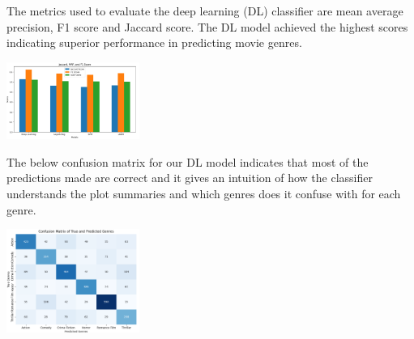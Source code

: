 \documentclass[hbrs-poster.tex]{subfiles}
\begin{document}
    {
    The metrics used to evaluate the deep learning (DL) classifier are mean average precision, F1 score and Jaccard score. The DL model achieved the highest scores indicating superior performance in predicting movie genres.
        \begin{tikzfigure}
                \includegraphics[width=0.325\textwidth, height=0.1\textheight]{figures/metrics.png}
            \end{tikzfigure}

    The below confusion matrix for our DL model indicates that most of the predictions made are correct and it gives an intuition of how the classifier understands the plot summaries and which genres does it confuse with for each genre.
    \begin{tikzfigure}
                \includegraphics[width=0.325\textwidth, height=0.1\textheight]{figures/confusion_matrix.png}
    \end{tikzfigure}
    }
\end{document}
